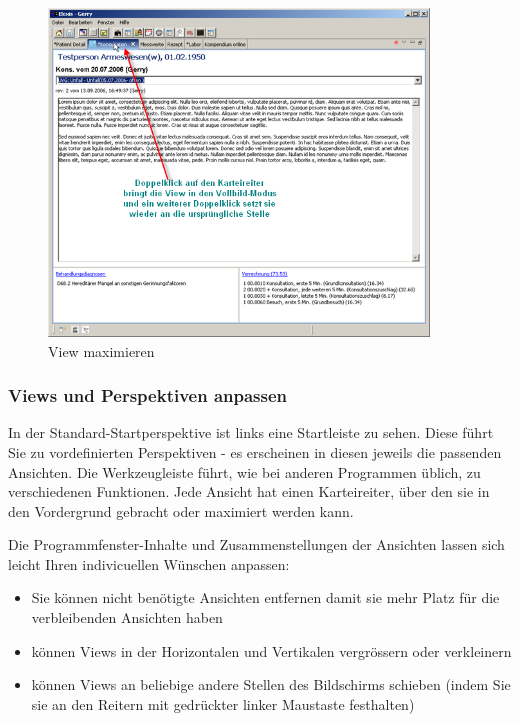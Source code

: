 \begin{figure}[htp]
\begin{center}
  \includegraphics[width=0.9\textwidth]{images/tour3}
  \caption{View maximieren}
  \label{fig:tour3}
\end{center}
\end{figure}

\subsubsection{Views und Perspektiven anpassen}


In der Standard-Startperspektive ist links eine \glqq Startleiste\grqq{} zu
sehen. Diese führt Sie zu vordefinierten Perspektiven - es erscheinen in diesen
jeweils die passenden Ansichten. Die Werkzeugleiste führt, wie bei anderen
Programmen üblich, zu verschiedenen Funktionen. Jede Ansicht hat einen
Karteireiter, über den sie in den Vordergrund gebracht oder maximiert werden kann.
\par
{}
\medskip
Die Programmfenster-Inhalte und Zusammenstellungen der Ansichten lassen sich leicht Ihren indivicuellen Wünschen anpassen:\\

\begin{itemize}
  \item Sie können nicht benötigte Ansichten entfernen damit sie mehr Platz für
  die verbleibenden Ansichten haben
	\item können Views in der Horizontalen und Vertikalen vergrössern oder verkleinern
	\item können Views an beliebige andere Stellen des Bildschirms schieben (indem Sie sie
	an den Reitern mit gedrückter linker Maustaste \glqq festhalten\grqq{})
\end{itemize}

